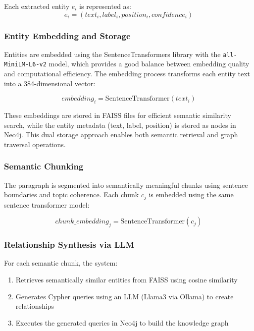 \documentclass[conference]{IEEEtran}
\begin{document}
Each extracted entity $e_i$ is represented as:
\begin{equation}
e_i = (text_i, label_i, position_i, confidence_i)
\end{equation}

\subsubsection{Entity Embedding and Storage}
Entities are embedded using the SentenceTransformers library with the \texttt{all-MiniLM-L6-v2} model, which provides a good balance between embedding quality and computational efficiency. The embedding process transforms each entity text into a 384-dimensional vector:

\begin{equation}
embedding_i = \text{SentenceTransformer}(text_i)
\end{equation}

These embeddings are stored in FAISS files for efficient semantic similarity search, while the entity metadata (text, label, position) is stored as nodes in Neo4j. This dual storage approach enables both semantic retrieval and graph traversal operations.

\subsubsection{Semantic Chunking}
The paragraph is segmented into semantically meaningful chunks using sentence boundaries and topic coherence. Each chunk $c_j$ is embedded using the same sentence transformer model:

\begin{equation}
chunk\_embedding_j = \text{SentenceTransformer}(c_j)
\end{equation}

\subsubsection{Relationship Synthesis via LLM}
For each semantic chunk, the system:
\begin{enumerate}
\item Retrieves semantically similar entities from FAISS using cosine similarity
\item Generates Cypher queries using an LLM (Llama3 via Ollama) to create relationships
\item Executes the generated queries in Neo4j to build the knowledge graph
\end{enumerate}
\end{document}
